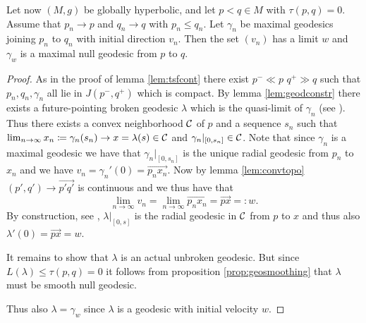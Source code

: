 \begin{lemma}\label{lem:cutlemma}
Let now $(M,g)$ be globally hyperbolic, and let $p<q\in M$ with $\tau(p,q)=0$. Assume that $p_n\to p$ and $q_n \to q$ with $p_n\leq q_n$. Let $\gamma_n$ be maximal geodesics joining $p_n$ to $q_n$ with initial direction $v_n$. Then the set $(v_n)$ has a limit $w$ and $\gamma_w$ is a maximal null geodesic from $p$ to $q$. 
\end{lemma}
\begin{proof}
As in the proof of lemma \ref{lem:tsfcont} there exist $p^-\ll p$ $q^+\gg q$ such that $p_n,q_n,\gamma_n$ all lie in $J(p^-,q^+)$ which is compact. By lemma \ref{lem:geodconstr} there exists a future-pointing broken geodesic $\lambda$ which is the quasi-limit of $\gamma_n$ (see \cite[Def. 14.7]{oneill}). Thus there exists a convex neighborhood $\mathcal{C}$ of $p$ and a sequence $s_n$ such that $\lim_{n\to\infty} x_n\coloneqq\gamma_n(s_n)\to x=\lambda(s) \in \mathcal{C}$ and $\gamma_n\rvert_{[0,s_n]}\in \mathcal{C}$. Note that since $\gamma_n$ is a maximal geodesic we have that $\gamma_n\rvert_{[0,s_n]}$ is the unique radial geodesic from $p_n$ to $x_n$ and we have $v_n=\gamma_n'(0) = \overrightarrow{p_nx_n}$. Now by lemma \ref{lem:convtopo} $(p',q')\to \overrightarrow{p'q'}$ is continuous and we thus have that 
\[
\lim_{n\to \infty}v_n = \lim_{n\to \infty}\overrightarrow{p_nx_n} = \overrightarrow{px} =: w.
\]
By construction, see \cite[Lemma 14.14]{oneill}, $\lambda\rvert_{[0,s]}$ is the radial geodesic in $\mathcal{C}$ from $p$ to $x$ and thus also $\lambda'(0) =\overrightarrow{px}= w$.

It remains to show that $\lambda$ is an actual unbroken geodesic. But since $L(\lambda)\leq \tau(p,q) = 0$ it follows from proposition \ref{prop:geosmoothing} that $\lambda$ must be smooth null geodesic.

Thus also $\lambda = \gamma_w$ since $\lambda$ is a geodesic with initial velocity $w$.
\end{proof}


